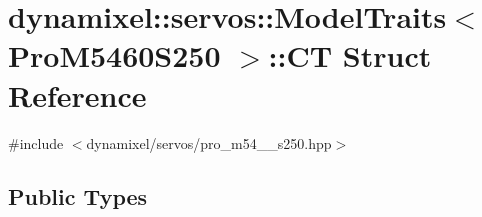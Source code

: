 \hypertarget{structdynamixel_1_1servos_1_1_model_traits_3_01_pro_m5460_s250_01_4_1_1_c_t}{}\section{dynamixel\+:\+:servos\+:\+:Model\+Traits$<$ Pro\+M5460\+S250 $>$\+:\+:CT Struct Reference}
\label{structdynamixel_1_1servos_1_1_model_traits_3_01_pro_m5460_s250_01_4_1_1_c_t}


{\ttfamily \#include $<$dynamixel/servos/pro\+\_\+m54\+\_\+\_\+s250.\+hpp$>$}

\subsection*{Public Types}
